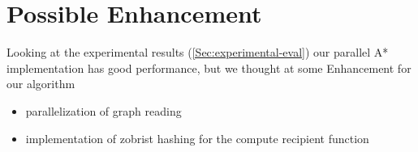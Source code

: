 \section{Possible Enhancement}
\label{Sec:enhancement}

Looking at the experimental results (\ref{Sec:experimental-eval}) our parallel A* implementation has good performance, 
but we thought at some Enhancement for our algorithm

\begin{itemize}
    \item parallelization of graph reading
    \item implementation of zobrist hashing for the compute recipient function
\end{itemize}

